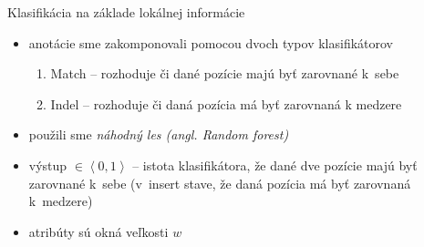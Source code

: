 \documentclass[xcolor=dvipsnames, compress, 12pt]{beamer}
\theoremstyle{definition}
\begin{document}
\begin{frame}{Klasifikácia na základe lokálnej informácie}
\begin{itemize}
  \item anotácie sme zakomponovali pomocou dvoch typov klasifikátorov
  \begin{enumerate}
    \item Match -- rozhoduje či dané pozície majú byť zarovnané k~sebe
    \item Indel -- rozhoduje či daná pozícia má byť zarovnaná k medzere
  \end{enumerate}
  \item použili sme \emph{náhodný les (angl. Random forest)} \cite{randomForestPaper}
  \item výstup $\in \left<0,1\right>$ -- istota klasifikátora, že dané dve pozície majú byť zarovnané k~sebe (v~insert stave, že daná pozícia má  byť zarovnaná k~medzere)
  \item atribúty sú okná veľkosti $w$
\end{itemize}
\end{frame}
\end{document}
